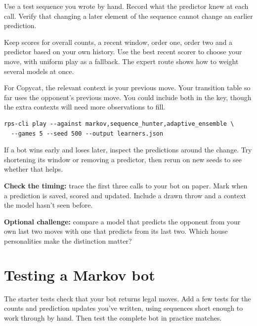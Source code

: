 \documentclass[11pt]{article}
\begin{document}
Use a test sequence you wrote by hand. Record what the predictor knew at each call. Verify that changing a later element of the sequence cannot change an earlier prediction.



Keep scores for overall counts, a recent window, order one, order two and a predictor based on your own history. Use the best recent scorer to choose your move, with uniform play as a fallback. The expert route shows how to weight several models at once.


For Copycat, the relevant context is your previous move. Your transition table so far uses the opponent's previous move. You could include both in the key, though the extra contexts will need more observations to fill.


\begin{lstlisting}[style=shell,numbers=none,xleftmargin=4pt,framexleftmargin=0pt]
rps-cli play --against markov,sequence_hunter,adaptive_ensemble \
  --games 5 --seed 500 --output learners.json
\end{lstlisting}

If a bot wins early and loses later, inspect the predictions around the change. Try shortening its window or removing a predictor, then rerun on new seeds to see whether that helps.


\begin{checkpoint}
\textbf{Check the timing:} trace the first three calls to your bot on paper. Mark when a prediction is saved, scored and updated. Include a drawn throw and a context the model hasn't seen before.
\end{checkpoint}

\textbf{Optional challenge:} compare a model that predicts the opponent from your own last two moves with one that predicts from its last two. Which house personalities make the distinction matter?
\par
\clearpage
\section*{Testing a Markov bot}

\begin{context}
The starter tests check that your bot returns legal moves. Add a few tests for the counts and prediction updates you've written, using sequences short enough to work through by hand. Then test the complete bot in practice matches.

\end{context}
\end{document}
